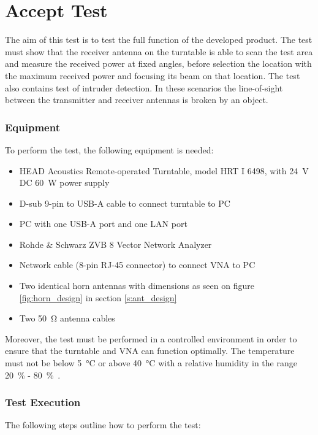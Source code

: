 \section{Accept Test}
The aim of this test is to test the full function of the developed product. The test must show that the receiver antenna on the turntable is able to scan the test area and measure the received power at fixed angles, before selection the location with the maximum received power and focusing its beam on that location. The test also contains test of intruder detection. In these scenarios the line-of-sight between the transmitter and receiver antennas is broken by an object. 

\subsubsection{Equipment}
To perform the test, the following equipment is needed:

\begin{itemize}
    \item HEAD Acoustics Remote-operated Turntable, model HRT I 6498, with \SI{24}{\volt} DC \SI{60}{W} power supply
    \item D-sub 9-pin to USB-A cable to connect turntable to PC
    \item PC with one USB-A port and one LAN port
    \item Rohde \& Schwarz ZVB 8 Vector Network Analyzer
    \item Network cable (8-pin RJ-45 connector) to connect VNA to PC
    \item Two identical horn antennas with dimensions as seen on figure \ref{fig:horn_design} in section \ref{s:ant_design}
    \item Two \SI{50}{\ohm} antenna cables
\end{itemize}

Moreover, the test must be performed in a controlled environment in order to ensure that the turntable and VNA can function optimally. The temperature must not be below \SI{5}{\celsius} or above \SI{40}{\celsius} with a relative humidity in the range \SI{20}{\percent} - \SI{80}{\percent}~\cite{hrt_i_data_sheet}\cite{vna_data_sheet_spec}.

\subsubsection{Test Execution}
The following steps outline how to perform the test:


